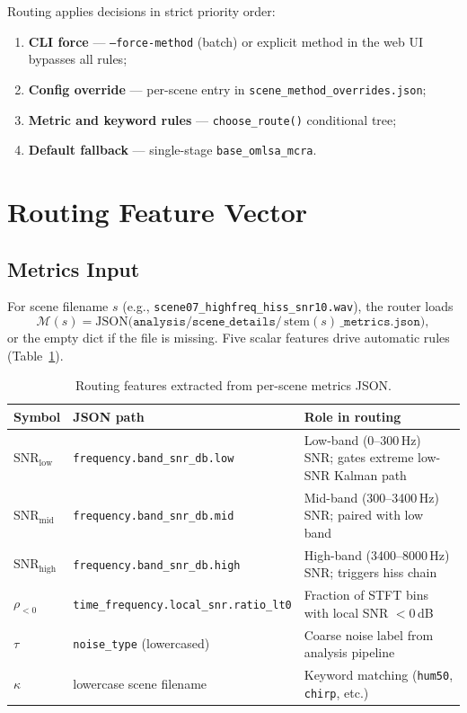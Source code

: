Routing applies decisions in strict priority order:
\begin{enumerate}
  \item \textbf{CLI force} --- \texttt{--force-method} (batch) or explicit method in the web UI bypasses all rules;
  \item \textbf{Config override} --- per-scene entry in \texttt{scene\_method\_overrides.json};
  \item \textbf{Metric and keyword rules} --- \texttt{choose\_route()} conditional tree;
  \item \textbf{Default fallback} --- single-stage \texttt{base\_omlsa\_mcra}.
\end{enumerate}


\section{Routing Feature Vector}
\label{sec:routing_features}

\subsection{Metrics Input}

For scene filename $s$ (e.g., \texttt{scene07\_highfreq\_hiss\_snr10.wav}), the router loads
\begin{equation}
  \mathcal{M}(s) = \text{JSON}\bigl(\texttt{analysis/scene\_details/}\,\mathrm{stem}(s)\,\texttt{\_metrics.json}\bigr),
\end{equation}
or the empty dict if the file is missing. Five scalar features drive automatic rules (Table~\ref{tab:routing_features}).

\begin{table}[H]
  \centering
  \caption{Routing features extracted from per-scene metrics JSON.}
  \label{tab:routing_features}
  \small
  \begin{tabularx}{\textwidth}{l l X}
    \toprule
    \textbf{Symbol} & \textbf{JSON path} & \textbf{Role in routing} \\
    \midrule
    $\mathrm{SNR}_{\mathrm{low}}$  & \texttt{frequency.band\_snr\_db.low}  & Low-band (0--300\,Hz) SNR; gates extreme low-SNR Kalman path \\
    $\mathrm{SNR}_{\mathrm{mid}}$  & \texttt{frequency.band\_snr\_db.mid}  & Mid-band (300--3400\,Hz) SNR; paired with low band \\
    $\mathrm{SNR}_{\mathrm{high}}$ & \texttt{frequency.band\_snr\_db.high} & High-band (3400--8000\,Hz) SNR; triggers hiss chain \\
    $\rho_{<0}$                     & \texttt{time\_frequency.local\_snr.ratio\_lt0} & Fraction of STFT bins with local SNR $<0$\,dB \\
    $\tau$                           & \texttt{noise\_type} (lowercased)     & Coarse noise label from analysis pipeline \\
    $\kappa$                         & lowercase scene filename              & Keyword matching (\texttt{hum50}, \texttt{chirp}, etc.) \\
    \bottomrule
  \end{tabularx}
\end{table}

